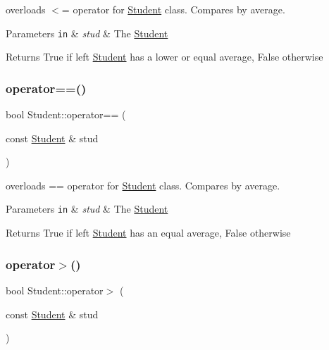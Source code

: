 overloads $<$= operator for \mbox{\hyperlink{class_student}{Student}} class. Compares by average. 


\begin{DoxyParams}[1]{Parameters}
\mbox{\tt in}  & {\em stud} & The \mbox{\hyperlink{class_student}{Student}}\\
\hline
\end{DoxyParams}
\begin{DoxyReturn}{Returns}
True if left \mbox{\hyperlink{class_student}{Student}} has a lower or equal average, False otherwise 
\end{DoxyReturn}
\mbox{\label{class_student_a4023157958bdbdca27935f3ded2b5258}} 
\subsubsection{\texorpdfstring{operator==()}{operator==()}}
{\footnotesize\ttfamily bool Student\+::operator== (\begin{DoxyParamCaption}\item[{const \mbox{\hyperlink{class_student}{Student}} \&}]{stud }\end{DoxyParamCaption})\hspace{0.3cm}{\ttfamily [inline]}}



overloads == operator for \mbox{\hyperlink{class_student}{Student}} class. Compares by average. 


\begin{DoxyParams}[1]{Parameters}
\mbox{\tt in}  & {\em stud} & The \mbox{\hyperlink{class_student}{Student}}\\
\hline
\end{DoxyParams}
\begin{DoxyReturn}{Returns}
True if left \mbox{\hyperlink{class_student}{Student}} has an equal average, False otherwise 
\end{DoxyReturn}
\mbox{\label{class_student_a9e9043b18fba023db54fb17fa29fc9b2}} 
\subsubsection{\texorpdfstring{operator$>$()}{operator>()}}
{\footnotesize\ttfamily bool Student\+::operator$>$ (\begin{DoxyParamCaption}\item[{const \mbox{\hyperlink{class_student}{Student}} \&}]{stud }\end{DoxyParamCaption})\hspace{0.3cm}{\ttfamily [inline]}}



